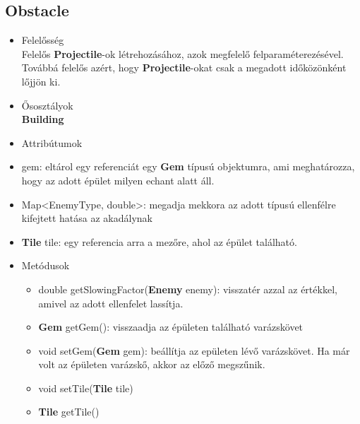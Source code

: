 \subsection{Obstacle}
\begin{itemize}
\item Felelősség\\
Felelős \textbf{Projectile}-ok létrehozásához, azok megfelelő felparaméterezésével. Továbbá felelős azért, hogy \textbf{Projectile}-okat csak a megadott időközönként lőjjön ki.
\item Ősosztályok\\
\textbf{Building}
\item Attribútumok\\
		\item gem: eltárol egy referenciát egy \textbf{Gem} típusú objektumra, ami meghatározza, hogy az adott épület milyen echant alatt áll.
		\item Map<EnemyType, double>: megadja mekkora az adott típusú ellenfélre kifejtett hatása az akadálynak
		\item \textbf{Tile} tile: egy referencia arra a mezőre, ahol az épület található.
\item Metódusok
	\begin{itemize}
		\item double getSlowingFactor(\textbf{Enemy} enemy): visszatér azzal az értékkel, amivel az adott ellenfelet lassítja.
		\item \textbf{Gem} getGem(): visszaadja az épületen található varázskövet
		\item void setGem(\textbf{Gem} gem): beállítja az epületen lévő varázskövet. Ha már volt az épületen varázskő, akkor az előző megszűnik.
		\item void setTile(\textbf{Tile} tile)
		\item \textbf{Tile} getTile()
	\end{itemize}
\end{itemize}



